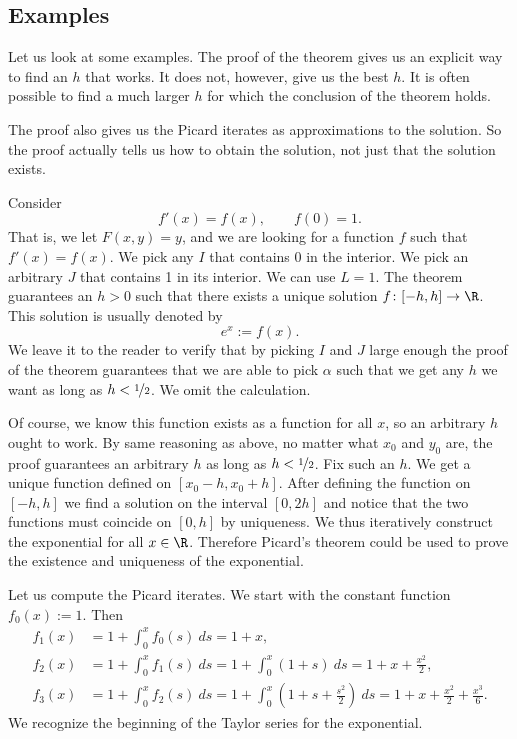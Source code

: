 \documentclass[12pt]{book}
\begin{document}
\subsection*{Examples}

Let us look at some examples.
The proof of the theorem 
gives us an explicit way to find an $h$ that works.
It does not, however, give
us the best $h$.
It is often possible to find a much larger $h$ for
which the conclusion of the theorem holds.

The proof also gives us the Picard iterates as approximations to the
solution.
So the proof actually tells us how to obtain
the solution, not just that the solution exists.

\begin{example}
Consider
\begin{equation*}
f'(x) = f(x), \qquad f(0) = 1 .
\end{equation*}
That is, we let $F(x,y) = y$, and we are looking for a function 
$f$ such that $f'(x) = f(x)$.
We pick any $I$ that contains 0
in the interior.
We pick an arbitrary $J$ that contains 1 in its interior.
We can
use $L = 1$.
The theorem guarantees an $h > 0$ such that
there exists a unique solution $f \colon [-h,h] \to \R$.
This solution
is usually denoted by
\begin{equation*}
e^x := f(x) .
\end{equation*}
We leave it to the reader to verify that by picking $I$ and $J$
large enough the proof of the theorem guarantees that
we are able to pick $\alpha$ such that we get any
$h$ we want as long as $h < \nicefrac{1}{2}$.
We omit the calculation.

Of course, we know %
this function exists
as a function for all $x$, so an arbitrary $h$ ought to work.
By same reasoning as above,
no matter what $x_0$ and $y_0$ are,
the proof guarantees an arbitrary $h$ as long as $h < \nicefrac{1}{2}$.
Fix such an $h$.
We get a unique function defined on $[x_0-h,x_0+h]$.
After defining the
function on $[-h,h]$ we find a solution on the interval $[0,2h]$
and notice that the two functions must coincide on $[0,h]$ by uniqueness.
We thus iteratively construct the exponential for all $x \in \R$.
Therefore Picard's theorem could be used to prove the existence and uniqueness
of the exponential.

Let us compute the Picard iterates.
We start with the constant function $f_0(x) := 1$.
Then
\begin{align*}
f_1(x) & = 1 + \int_0^x f_0(s)~ds =
1+x, \\
f_2(x) & = 1 + \int_0^x f_1(s)~ds =
1 + \int_0^x (1+s)~ds = 1 + x + \frac{x^2}{2}, \\
f_3(x) & = 1 + \int_0^x f_2(s)~ds =
1 + \int_0^x \left(1+ s + \frac{s^2}{2} \right)~ds =
1 + x + \frac{x^2}{2} + \frac{x^3}{6} .
\end{align*}
We recognize the beginning of the Taylor series for the exponential.
\end{example}
\end{document}
